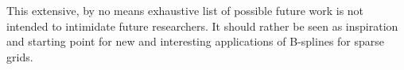   

This extensive, by no means exhaustive list of possible future work is not
intended to intimidate future researchers.
It should rather be seen as inspiration and starting point
for new and interesting applications of B-splines for sparse grids.


\cleardoublepage
